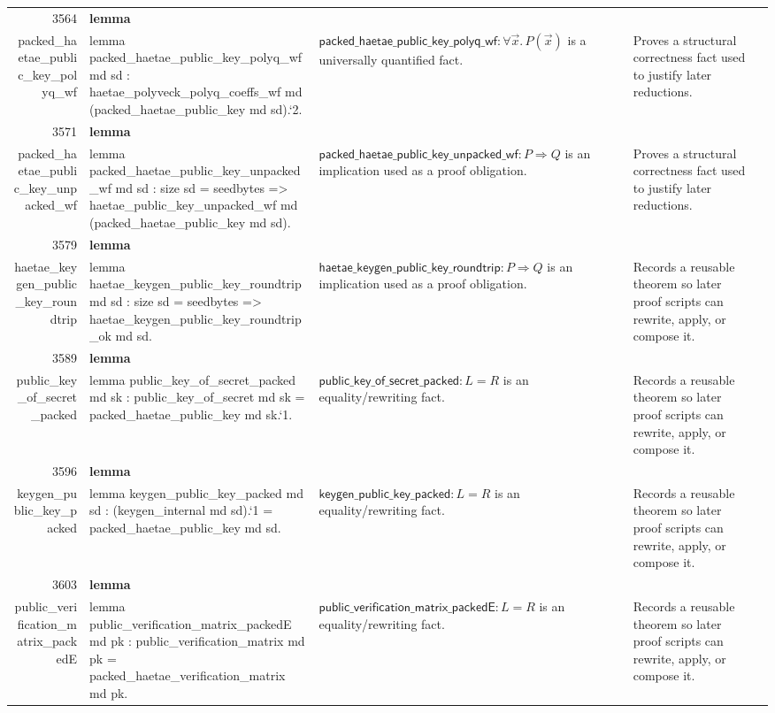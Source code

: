 \documentclass[10pt]{article}
\newcommand{\ec}[1]{\begingroup\ttfamily\scriptsize #1\endgroup}
\begin{document}
\begin{longtable}{r L{0.17\textwidth} L{0.26\textwidth} L{0.27\textwidth} L{0.20\textwidth}}
3564 & \textbf{lemma}\\\ec{packed\_haetae\_public\_key\_polyq\_wf} & \ec{lemma packed\_haetae\_public\_key\_polyq\_wf md sd : haetae\_polyveck\_polyq\_coeffs\_wf md (packed\_haetae\_public\_key md sd).`2.} & \(\mathsf{packed\_haetae\_public\_key\_polyq\_wf} : \forall \vec{x}.\, P(\vec{x})\) is a universally quantified fact. & Proves a structural correctness fact used to justify later reductions. \\
3571 & \textbf{lemma}\\\ec{packed\_haetae\_public\_key\_unpacked\_wf} & \ec{lemma packed\_haetae\_public\_key\_unpacked\_wf md sd : size sd = seedbytes => haetae\_public\_key\_unpacked\_wf md (packed\_haetae\_public\_key md sd).} & \(\mathsf{packed\_haetae\_public\_key\_unpacked\_wf} : P \Rightarrow Q\) is an implication used as a proof obligation. & Proves a structural correctness fact used to justify later reductions. \\
3579 & \textbf{lemma}\\\ec{haetae\_keygen\_public\_key\_roundtrip} & \ec{lemma haetae\_keygen\_public\_key\_roundtrip md sd : size sd = seedbytes => haetae\_keygen\_public\_key\_roundtrip\_ok md sd.} & \(\mathsf{haetae\_keygen\_public\_key\_roundtrip} : P \Rightarrow Q\) is an implication used as a proof obligation. & Records a reusable theorem so later proof scripts can rewrite, apply, or compose it. \\
3589 & \textbf{lemma}\\\ec{public\_key\_of\_secret\_packed} & \ec{lemma public\_key\_of\_secret\_packed md sk : public\_key\_of\_secret md sk = packed\_haetae\_public\_key md sk.`1.} & \(\mathsf{public\_key\_of\_secret\_packed} : L = R\) is an equality/rewriting fact. & Records a reusable theorem so later proof scripts can rewrite, apply, or compose it. \\
3596 & \textbf{lemma}\\\ec{keygen\_public\_key\_packed} & \ec{lemma keygen\_public\_key\_packed md sd : (keygen\_internal md sd).`1 = packed\_haetae\_public\_key md sd.} & \(\mathsf{keygen\_public\_key\_packed} : L = R\) is an equality/rewriting fact. & Records a reusable theorem so later proof scripts can rewrite, apply, or compose it. \\
3603 & \textbf{lemma}\\\ec{public\_verification\_matrix\_packedE} & \ec{lemma public\_verification\_matrix\_packedE md pk : public\_verification\_matrix md pk = packed\_haetae\_verification\_matrix md pk.} & \(\mathsf{public\_verification\_matrix\_packedE} : L = R\) is an equality/rewriting fact. & Records a reusable theorem so later proof scripts can rewrite, apply, or compose it. \\

\end{longtable}
\end{document}
